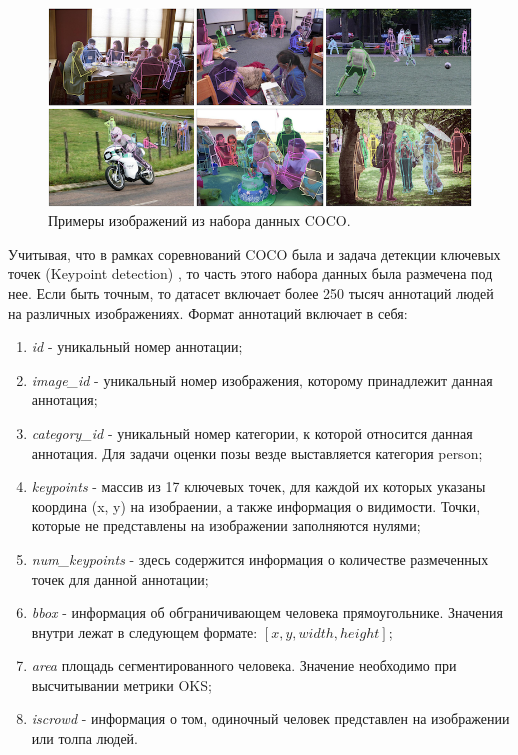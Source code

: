 \begin{figure}[h]
	\centering
	\includegraphics[width=\textwidth]{./images/coco_dataset.png}
	\caption{Примеры изображений из набора данных COCO. \cite{COCO_topology}}
	\label{fig:coco_dataset}
\end{figure}

Учитывая, что в рамках соревнований COCO была и задача детекции ключевых точек (Keypoint detection) \cite{COCO_topology}, то часть этого набора данных была размечена под нее. Если быть точным, то датасет включает более 250 тысяч аннотаций людей на различных изображениях. Формат аннотаций включает в себя:

\begin{enumerate}

\item \textit{id} - уникальный номер аннотации;

\item \textit{image\_id} - уникальный номер изображения, которому принадлежит данная аннотация;

\item \textit{category\_id} - уникальный номер категории, к которой относится данная аннотация. Для задачи оценки позы везде выставляется категория person;

\item \textit{keypoints} - массив из 17 ключевых точек, для каждой их которых указаны координа (x, y) на изобраении, а также информация о видимости. Точки, которые не представлены на изображении заполняются нулями;

\item \textit{num\_keypoints} - здесь содержится информация о количестве размеченных точек для данной аннотации;

\item \textit{bbox} - информация об обграничивающем человека прямоугольнике. Значения внутри лежат в следующем формате: $[x, y, width, height]$;

\item \textit{area} площадь сегментированного человека. Значение необходимо при высчитывании метрики OKS;

\item \textit{iscrowd} - информация о том, одиночный человек представлен на изображении или толпа людей.

\end{enumerate}

